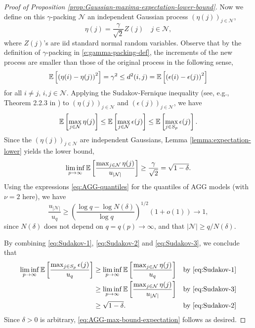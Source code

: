 \begin{proof}[Proof of Proposition \ref{prop:Gaussian-maxima-expectation-lower-bound}]
Now we define on this $\gamma$-packing $\mathcal{N}$ an independent Gaussian process $\left(\eta(j)\right)_{j\in\mathcal{N}}$, 
$$\eta(j) = \frac{\gamma}{\sqrt{2}}Z(j) \quad j\in \mathcal{N},$$
where $Z(j)$'s are iid standard normal random variables.
Observe that by the definition of $\gamma$-packing in \eqref{e:gamma-packing-def}, the increments of the new process are smaller than those of the original process in the following sense, 
$$
{\mathbb E}\left[\left(\eta(i)-\eta(j)\right)^2\right] = \gamma^2 \le d^2(i,j) = {\mathbb E}\left[\left(\epsilon(i)-\epsilon(j)\right)^2\right]
$$
for all $i\neq j$, $i,j\in\mathcal{N}$. Applying the Sudakov-Fernique inequality (see, e.g., Theorem 2.2.3 in \citep{adler2009random}) to  $\left(\eta(j)\right)_{j\in\mathcal{N}}$ and  $\left(\epsilon(j)\right)_{j\in\mathcal{N}}$, we have
\begin{equation}\label{eq:Sudakov-1}
{\mathbb E}\left[\max_{j\in\mathcal{N}}\eta(j)\right] \le {\mathbb E}\left[\max_{j\in\mathcal{N}}\epsilon(j)\right] \le {\mathbb E}\left[\max_{j\in{S_p}}\epsilon(j)\right].
\end{equation}
Since the $\left(\eta(j)\right)_{j\in\mathcal{N}}$ are independent Gaussians, Lemma \ref{lemma:expectation-lower} yields the lower bound,
\begin{equation}\label{eq:Sudakov-2}
\liminf_{p\to\infty} {\mathbb E}\left[\frac{\max_{j\in\mathcal{N}}\eta(j)}{u_{|\mathcal{N}|}}\right] \ge \frac{\gamma}{\sqrt{2}} = \sqrt{1-\delta}.
\end{equation}
Using the expressions \eqref{eq:AGG-quantiles} for the quantiles 
of AGG models (with $\nu=2$ here), we have
\begin{equation}\label{eq:Sudakov-3}
\frac{u_{|\mathcal{N}|}}{u_q} 
\ge \left(\frac{\log q-\log{N(\delta)}}{\log{q}}\right)^{1/2}\left(1+o(1)\right)\to 1,
\end{equation}
since $N(\delta)$ does not depend on $q= q(p)\to \infty$, and that $|\mathcal{N}|\ge q/N(\delta)$.

By combining \eqref{eq:Sudakov-1}, \eqref{eq:Sudakov-2} and \eqref{eq:Sudakov-3}, we conclude that
\begin{align*}
    \liminf_{p\to\infty} {\mathbb E}\left[\frac{\max_{j\in{S_p}}\epsilon(j)}{u_q}\right] 
    &\ge \liminf_{p\to\infty} {\mathbb E}\left[\frac{\max_{j\in\mathcal{N}}\eta(j)}{u_q}\right] &\text{by } \eqref{eq:Sudakov-1}\\
    &\ge \liminf_{p\to\infty} {\mathbb E}\left[\frac{\max_{j\in\mathcal{N}}\eta(j)}{u_{|\mathcal{N}|}}\right]  &\text{by } \eqref{eq:Sudakov-3} \\
    &\ge \sqrt{1-\delta}.  &\text{by } \eqref{eq:Sudakov-2}
\end{align*} 
Since $\delta>0$ is arbitrary, \eqref{eq:AGG-max-bound-expectation} follows as desired.
\end{proof}

